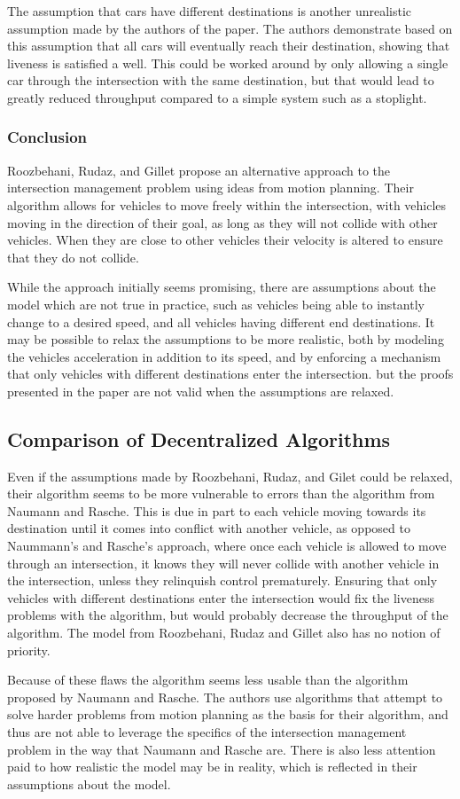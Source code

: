 \documentclass[12pt]{article}
\begin{document}
The assumption that cars have different destinations is another unrealistic assumption made by the authors of the paper. The authors demonstrate based on this assumption that all cars will eventually reach their destination, showing that liveness is satisfied a well. This could be worked around by only allowing a single car through the intersection with the same destination, but that would lead to greatly reduced throughput compared to a simple system such as a stoplight.
\subsubsection{Conclusion}
Roozbehani, Rudaz, and Gillet propose an alternative approach to the intersection management problem using ideas from motion planning. Their algorithm allows for vehicles to move freely within the intersection, with vehicles moving in the direction of their goal, as long as they will not collide with other vehicles. When they are close to other vehicles their velocity is altered to ensure that they do not collide.\par
While the approach initially seems promising, there are assumptions about the model which are not true in practice, such as vehicles being able to instantly change to a desired speed, and all vehicles having different end destinations. It may be possible to relax the assumptions to be more realistic, both by modeling the vehicles acceleration in addition to its speed, and by enforcing a mechanism that only vehicles with different destinations enter the intersection. but the proofs presented in the paper are not valid when the assumptions are relaxed.\par
\subsection{Comparison of Decentralized Algorithms}
Even if the assumptions made by Roozbehani, Rudaz, and Gilet could be relaxed, their algorithm seems to be more vulnerable to errors than the algorithm from Naumann and Rasche. This is due in part to each vehicle moving towards its destination until it comes into conflict with another vehicle, as opposed to Naummann's and Rasche's approach, where once each vehicle is allowed to move through an intersection, it knows they will never collide with another vehicle in the intersection, unless they relinquish control prematurely. Ensuring that only vehicles with different destinations enter the intersection would fix the liveness problems with the algorithm, but would probably decrease the throughput of the algorithm. The model from Roozbehani, Rudaz and Gillet also has no notion of priority.\par
Because of these flaws the algorithm seems less usable than the algorithm proposed by Naumann and Rasche. The authors use algorithms that attempt to solve harder problems from motion planning as the basis for their algorithm, and thus are not able to leverage the specifics of the intersection management problem in the way that Naumann and Rasche are. There is also less attention paid to how realistic the model may be in reality, which is reflected in their assumptions about the model.
\end{document}
